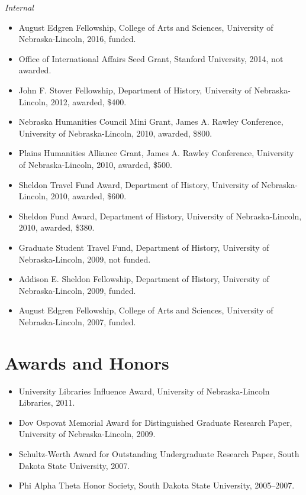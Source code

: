 \emph{Internal}

\begin{itemize}
\tightlist
\item
  August Edgren Fellowship, College of Arts and Sciences, University of
  Nebraska-Lincoln, 2016, funded.
\item
  Office of International Affairs Seed Grant, Stanford University, 2014,
  not awarded.
\item
  John F. Stover Fellowship, Department of History, University of
  Nebraska-Lincoln, 2012, awarded, \$400.
\item
  Nebraska Humanities Council Mini Grant, James A. Rawley Conference,
  University of Nebraska-Lincoln, 2010, awarded, \$800.
\item
  Plains Humanities Alliance Grant, James A. Rawley Conference,
  University of Nebraska-Lincoln, 2010, awarded, \$500.
\item
  Sheldon Travel Fund Award, Department of History, University of
  Nebraska-Lincoln, 2010, awarded, \$600.
\item
  Sheldon Fund Award, Department of History, University of
  Nebraska-Lincoln, 2010, awarded, \$380.
\item
  Graduate Student Travel Fund, Department of History, University of
  Nebraska-Lincoln, 2009, not funded.
\item
  Addison E. Sheldon Fellowship, Department of History, University of
  Nebraska-Lincoln, 2009, funded.
\item
  August Edgren Fellowship, College of Arts and Sciences, University of
  Nebraska-Lincoln, 2007, funded.
\end{itemize}

\section{Awards and Honors}\label{awards-and-honors}

\begin{itemize}
\tightlist
\item
  University Libraries Influence Award, University of Nebraska-Lincoln
  Libraries, 2011.
\item
  Dov Ospovat Memorial Award for Distinguished Graduate Research Paper,
  University of Nebraska-Lincoln, 2009.
\item
  Schultz-Werth Award for Outstanding Undergraduate Research Paper,
  South Dakota State University, 2007.
\item
  Phi Alpha Theta Honor Society, South Dakota State University,
  2005--2007.
\end{itemize}

